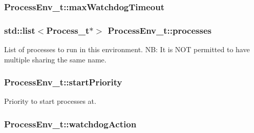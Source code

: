 \subsubsection[{\texorpdfstring{max\+Watchdog\+Timeout}{maxWatchdogTimeout}}]{ Process\+Env\+\_\+t\+::max\+Watchdog\+Timeout}\hypertarget{struct_process_env__t_ad23f2b3f155e2b6b292047d17831dc43}{}\label{struct_process_env__t_ad23f2b3f155e2b6b292047d17831dc43}
\subsubsection[{\texorpdfstring{processes}{processes}}]{\setlength{\rightskip}{0pt plus 5cm}std\+::list$<${\bf Process\+\_\+t}$\ast$$>$ Process\+Env\+\_\+t\+::processes}\hypertarget{struct_process_env__t_a1482465d6fc9690b268d14b2f0599310}{}\label{struct_process_env__t_a1482465d6fc9690b268d14b2f0599310}
List of processes to run in this environment. NB\+: It is N\+OT permitted to have multiple sharing the same name. 
\subsubsection[{\texorpdfstring{start\+Priority}{startPriority}}]{ Process\+Env\+\_\+t\+::start\+Priority\hspace{0.3cm}{\ttfamily [private]}}\hypertarget{struct_process_env__t_a2dd1829f351345d80cf38aaf39ede70d}{}\label{struct_process_env__t_a2dd1829f351345d80cf38aaf39ede70d}


Priority to start processes at. 

\subsubsection[{\texorpdfstring{watchdog\+Action}{watchdogAction}}]{ Process\+Env\+\_\+t\+::watchdog\+Action}\hypertarget{struct_process_env__t_a2b12640f90f7d662883ce75527bb50e1}{}\label{struct_process_env__t_a2b12640f90f7d662883ce75527bb50e1}

